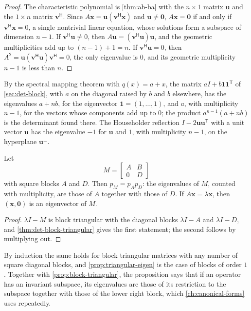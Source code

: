 \begin{proof}
The characteristic polynomial is \cref{thm:ab-ba} with the $n\times1$ matrix $\mathbf u$ and the $1\times n$ matrix $\mathbf v^{\mathsf H}$. Since $A\mathbf x=\mathbf u(\mathbf v^{\mathsf H}\mathbf x)$ and $\mathbf u\ne\mathbf 0$, $A\mathbf x=\mathbf 0$ if and only if $\mathbf v^{\mathsf H}\mathbf x=0$, a single nontrivial linear equation, whose solutions form a subspace of dimension $n-1$. If $\mathbf v^{\mathsf H}\mathbf u\ne0$, then $A\mathbf u=(\mathbf v^{\mathsf H}\mathbf u)\mathbf u$, and the geometric multiplicities add up to $(n-1)+1=n$. If $\mathbf v^{\mathsf H}\mathbf u=0$, then $A^2=\mathbf u(\mathbf v^{\mathsf H}\mathbf u)\mathbf v^{\mathsf H}=0$, the only eigenvalue is $0$, and its geometric multiplicity $n-1$ is less than $n$.
\end{proof}

By the spectral mapping theorem with $q(x)=a+x$, the matrix $aI+b\mathbf 1\mathbf 1^{\mathsf T}$ of \cref{sec:det-block}, with $a$ on the diagonal raised by $b$ and $b$ elsewhere, has the eigenvalues $a+nb$, for the eigenvector $\mathbf 1=(1,\ldots,1)$, and $a$, with multiplicity $n-1$, for the vectors whose components add up to $0$; the product $a^{n-1}(a+nb)$ is the determinant found there. The Householder reflection $I-2\mathbf u\mathbf u^{\mathsf T}$ with a unit vector $\mathbf u$ has the eigenvalue $-1$ for $\mathbf u$ and $1$, with multiplicity $n-1$, on the hyperplane $\mathbf u^\perp$.

\begin{proposition}
\label{prop:block-triangular-eigen}
Let
\[
M=\begin{bmatrix}A&B\\0&D\end{bmatrix}
\]
with square blocks $A$ and $D$. Then $p_M=p_Ap_D$: the eigenvalues of $M$, counted with multiplicity, are those of $A$ together with those of $D$. If $A\mathbf x=\lambda\mathbf x$, then $(\mathbf x,\mathbf 0)$ is an eigenvector of $M$.
\end{proposition}

\begin{proof}
$\lambda I-M$ is block triangular with the diagonal blocks $\lambda I-A$ and $\lambda I-D$, and \cref{thm:det-block-triangular} gives the first statement; the second follows by multiplying out.
\end{proof}

By induction the same holds for block triangular matrices with any number of square diagonal blocks, and \cref{prop:triangular-eigen} is the case of blocks of order $1$. Together with \cref{prop:block-triangular}, the proposition says that if an operator has an invariant subspace, its eigenvalues are those of its restriction to the subspace together with those of the lower right block, which \cref{ch:canonical-forms} uses repeatedly.

